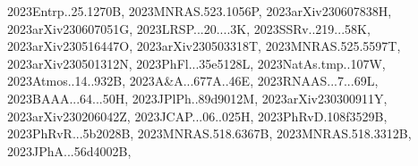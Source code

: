 \documentclass[12pt]{article}
\begin{document}
\begin{description}
{2023Entrp..25.1270B,%
2023MNRAS.523.1056P,%
2023arXiv230607838H,%
2023arXiv230607051G,%
2023LRSP...20....3K,%
2023SSRv..219...58K,%
2023arXiv230516447O,%
2023arXiv230503318T,%
2023MNRAS.525.5597T,%
2023arXiv230501312N,%
2023PhFl...35e5128L,%
2023NatAs.tmp..107W,%
2023Atmos..14..932B,%
2023A&A...677A..46E,%
2023RNAAS...7...69L,%
2023BAAA...64...50H,%
2023JPlPh..89d9012M,%
2023arXiv230300911Y,%
2023arXiv230206042Z,%
2023JCAP...06..025H,%
2023PhRvD.108f3529B,%
2023PhRvR...5b2028B,%
2023MNRAS.518.6367B,%
2023MNRAS.518.3312B,%
2023JPhA...56d4002B,%
}
\end{description}
\end{document}
